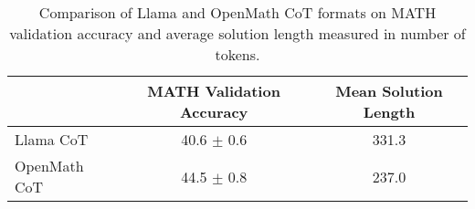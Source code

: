 \begin{table*}[t]
\setlength{\tabcolsep}{4pt}
    \centering
    \caption{Comparison of Llama and OpenMath CoT formats on MATH validation accuracy and average solution length measured in number of tokens. }
    \label{tab:soln_format}
    \begin{tabular}{lcc}
    \toprule

 &  MATH Validation Accuracy  &  Mean Solution Length  \\\midrule
Llama CoT       & 40.6 $\pm$ 0.6 & 331.3   \\
OpenMath CoT    & 44.5 $\pm$ 0.8  & 237.0  \\ 
\bottomrule 
    \end{tabular}
\end{table*}
